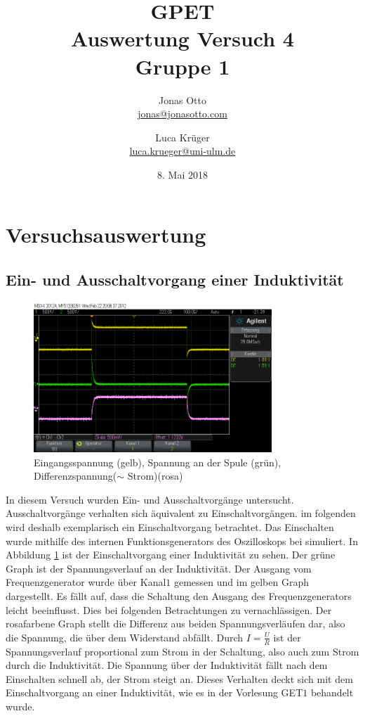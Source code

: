 \documentclass[a4paper]{article}
\title{GPET\\ Auswertung Versuch 4\\ Gruppe 1}
\author{Jonas Otto\\ \href{mailto:jonas@jonasotto.com}{jonas@jonasotto.com} 
   \and Luca Krüger \\ \href{mailto:luca.krueger@uni-ulm.de}{luca.krueger@uni-ulm.de} }
\date{8. Mai 2018}
\begin{document}
    
\maketitle

\section{Versuchsauswertung}

\subsection{Ein- und Ausschaltvorgang einer Induktivität}
\begin{figure}[H]
    \centering
    \includegraphics[width=0.8\textwidth]{versuch1_1.png}
    \caption{Eingangsspannung (gelb), Spannung an der Spule (grün), Differenzspannung($\sim$ Strom)(rosa) }
    \label{fig:versuch1-1}
\end{figure}
In diesem Versuch wurden Ein- und Ausschaltvorgänge untersucht. Ausschaltvorgänge verhalten sich äquivalent zu Einschaltvorgängen. im folgenden wird deshalb exemplarisch ein Einschaltvorgang betrachtet.
Das Einschalten wurde mithilfe des internen Funktionsgenerators des Oszilloskops bei simuliert.
In Abbildung \ref{fig:versuch1-1} ist der Einschaltvorgang einer Induktivität zu sehen. Der grüne Graph ist der Spannungsverlauf an der Induktivität. Der Ausgang vom Frequenzgenerator wurde über Kanal$1$ gemessen und im gelben Graph dargestellt. Es fällt auf, dass die Schaltung den Ausgang des Frequenzgenerators leicht beeinflusst. Dies bei folgenden Betrachtungen zu vernachlässigen. 
Der rosafarbene Graph stellt die Differenz aus beiden Spannungsverläufen dar, also die Spannung, die über dem Widerstand abfällt. Durch $I=\frac{U}{R}$ ist der Spannungsverlauf proportional zum Strom in der Schaltung, also auch zum Strom durch die Induktivität.
Die Spannung über der Induktivität fällt nach dem Einschalten schnell ab, der Strom steigt an. Dieses Verhalten deckt sich mit dem Einschaltvorgang an einer Induktivität, wie es in der Vorlesung GET$1$ behandelt wurde.
\end{document}
